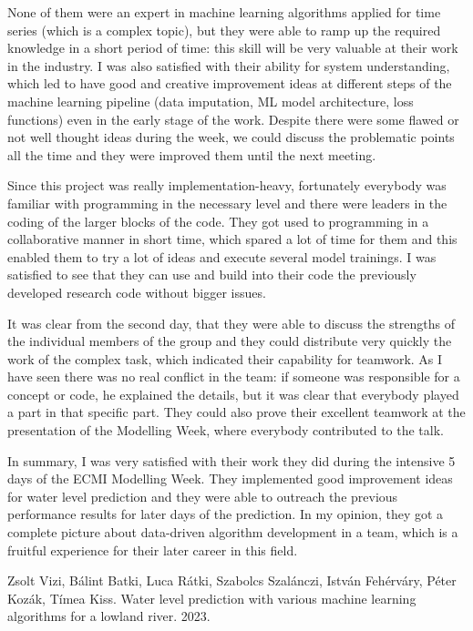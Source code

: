 \documentclass{article}
\begin{document}
None of them were an expert in machine learning algorithms applied for time
series (which is a complex topic), but they were able to ramp up the required
knowledge in a short period of time: this skill will be very valuable at their
work in the industry. I was also satisfied with their ability for system
understanding, which led to have good and creative improvement ideas at
different steps of the machine learning pipeline (data imputation, ML model
architecture, loss functions) even in the early stage of the work. Despite
there were some flawed or not well thought ideas during the week, we could
discuss the problematic points all the time and they were improved them until
the next meeting.

Since this project was really implementation-heavy, fortunately everybody was
familiar with programming in the necessary level and there were leaders in the
coding of the larger blocks of the code. They got used to programming in a
collaborative manner in short time, which spared a lot of time for them and
this enabled them to try a lot of ideas and execute several model trainings. I
was satisfied to see that they can use and build into their code the
previously developed research code without bigger issues.

It was clear from the second day, that they were able to discuss the strengths
of the individual members of the group and they could distribute very quickly
the work of the complex task, which indicated their capability for teamwork.
As I have seen there was no real conflict in the team: if someone was
responsible for a concept or code, he explained the details, but it was clear
that everybody played a part in that specific part. They could also prove
their excellent teamwork at the presentation of the Modelling Week, where
everybody contributed to the talk.

In summary, I was very satisfied with their work they did during the intensive
5 days of the ECMI Modelling Week. They implemented good improvement ideas for
water level prediction and they were able to outreach the previous performance
results for later days of the prediction. In my opinion, they got a complete
picture about data-driven algorithm development in a team, which is a fruitful
experience for their later career in this field.


\begin{thebibliography}{1}
  \label{docs-internal-guid-0a5e5cca-7fff-6f48-cf8a-a203f7614dd1}Zsolt
  Vizi, B{\'a}lint Batki, Luca R{\'a}tki, Szabolcs Szal{\'a}nczi, Istv{\'a}n
  Feh{\'e}rv{\'a}ry, P{\'e}ter Koz{\'a}k, T{\'i}mea Kiss. {\newblock}Water
  level prediction with various machine learning algorithms for a lowland
  river. {\newblock}2023.{\newblock}
\end{thebibliography}
\end{document}
